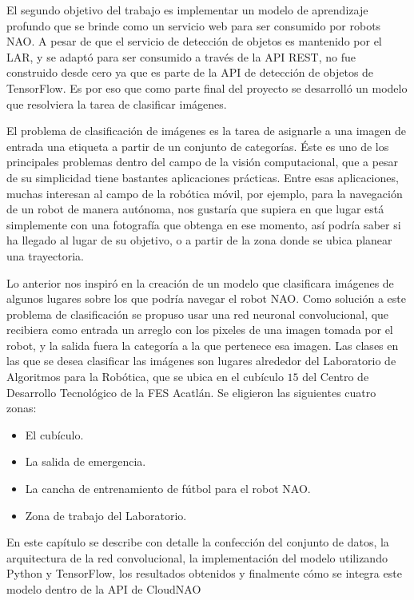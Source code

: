 %
%

El segundo objetivo del
trabajo es implementar un modelo de aprendizaje 
profundo que se brinde como un servicio web para ser consumido por robots NAO.
A pesar de que el servicio de detección de objetos es mantenido por el LAR, y 
se adaptó para ser consumido a través de la API REST, no fue construido
desde cero ya que es parte de la API de detección de objetos de TensorFlow.
Es por eso que como parte final del proyecto se desarrolló un modelo que 
resolviera la tarea de clasificar imágenes.

El problema de clasificación de imágenes es la tarea de asignarle a una imagen de
entrada una etiqueta a partir de un conjunto de categorías. Éste es uno de los principales
problemas dentro del campo de la visión computacional, que a pesar de su simplicidad
tiene bastantes aplicaciones prácticas. Entre esas aplicaciones, muchas interesan al
campo de la robótica móvil, por ejemplo, para la navegación de un robot de manera
autónoma, nos gustaría que supiera en que lugar está simplemente con una fotografía
que obtenga en ese momento, así podría saber si ha llegado al 
lugar de su objetivo, o a partir de la zona donde se ubica planear una trayectoria.

Lo anterior nos inspiró en la creación de un modelo que clasificara imágenes
de algunos lugares sobre los que podría navegar el robot NAO. 
Como solución a este problema de clasificación se propuso usar 
una red neuronal convolucional, que recibiera como entrada un arreglo con los
pixeles de una imagen tomada por el robot, y la salida fuera la categoría
a la que pertenece esa imagen. 
Las clases en las que se desea clasificar las imágenes son lugares alrededor
del Laboratorio de Algoritmos para la Robótica, que se ubica en el cubículo $15$ del
Centro de Desarrollo Tecnológico de la FES Acatlán. Se eligieron las siguientes cuatro zonas:

\begin{itemize}
    \item El cubículo.
    \item La salida de emergencia.
    \item La cancha de entrenamiento de fútbol para el robot NAO.
    \item Zona de trabajo del Laboratorio.
\end{itemize}


En este capítulo se describe con detalle la confección del
conjunto de datos, la arquitectura de la red 
convolucional, la implementación
del modelo utilizando Python y TensorFlow, los resultados obtenidos
y finalmente cómo se integra este modelo dentro de la API de CloudNAO 

%
%